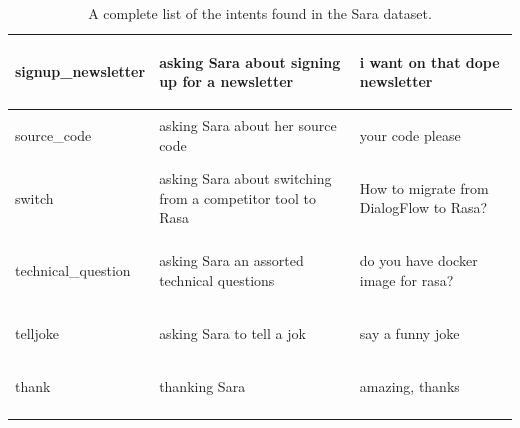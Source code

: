 \documentclass[bsc,frontabs,twoside,singlespacing,parskip,deptreport]{infthesis}
\begin{document}
{\begin{center}
\begin{longtable}{p{}|p{}|p{}}
    \hline
    \begin{spverbatim}signup_newsletter\end{spverbatim} & asking Sara about signing up for a newsletter & \begin{spverbatim}i want on that dope newsletter\end{spverbatim} \\
    \hline
    \begin{spverbatim}source_code\end{spverbatim} & asking Sara about her source code & \begin{spverbatim}your code please\end{spverbatim} \\
    \hline
    \begin{spverbatim}switch\end{spverbatim} & asking Sara about switching from a competitor tool to Rasa & \begin{spverbatim}How to migrate from DialogFlow to Rasa?\end{spverbatim} \\
    \hline
    \begin{spverbatim}technical_question\end{spverbatim} & asking Sara an assorted technical questions & \begin{spverbatim}do you have docker image for rasa?\end{spverbatim} \\
    \hline
    \begin{spverbatim}telljoke\end{spverbatim} & asking Sara to tell a jok & \begin{spverbatim}say a funny joke\end{spverbatim} \\
    \hline
    \begin{spverbatim}thank\end{spverbatim} & thanking Sara & \begin{spverbatim}amazing, thanks\end{spverbatim} \\
    \hline
    \caption{A complete list of the intents found in the Sara dataset.}
    \label{tab:sara-intent-list}
    \end{longtable}
  \end{center}
}
\end{document}
